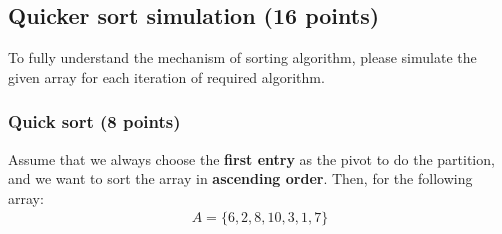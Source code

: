 \documentclass[11pt]{exam}
\begin{document}
\subsection{Quicker sort simulation (16 points)}
To fully understand the mechanism of sorting algorithm, please simulate the given array for each iteration of required algorithm.

\subsubsection{Quick sort (8 points)}

Assume that we always choose the \textbf{first entry} as the pivot to do the partition, and we want to sort the array in \textbf{ascending order}. Then, for the following array:
\begin{align*}
A = \{6, 2, 8, 10, 3, 1, 7\}
\end{align*}
\end{document}
